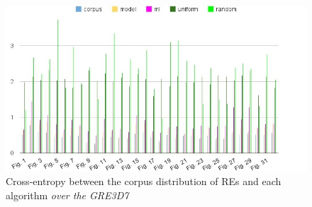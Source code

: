 \label{sec:apendice}

\begin{landscape}

\begin{figure}[h!]
\begin{center}
\includegraphics[width=1.2\textwidth]{images/entropyComplete.jpg}
\end{center}
\vspace*{-2em}
\caption{Cross-entropy between the corpus distribution of REs and each algorithm \textit{over the GRE3D7}}\label{Entropy}
\end{figure}


\end{landscape}


